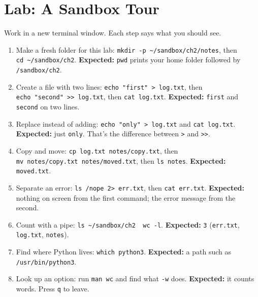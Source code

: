 \section{Lab: A Sandbox Tour}\label{02-the-shell-talking-to-your-computer-in-words:lab-a-sandbox-tour}

Work in a new terminal window. Each step says what you should see.

\begin{enumerate}
\def\labelenumi{\arabic{enumi}.}
\tightlist
\item
  Make a fresh folder for this lab: \texttt{mkdir\ -}\allowbreak{}\texttt{p\ \textasciitilde{}/}\allowbreak{}\texttt{sandbox/}\allowbreak{}\texttt{ch2/}\allowbreak{}\texttt{notes}, then \texttt{cd\ \textasciitilde{}/sandbox/ch2}. \textbf{Expected:} \texttt{pwd} prints your home folder followed by \texttt{/sandbox/ch2}.
\item
  Create a file with two lines: \texttt{echo\ "first"\ \textgreater{}\ log.txt}, then \texttt{echo\ "second"\ \textgreater{}\textgreater{}\ log.}\allowbreak{}\texttt{txt}, then \texttt{cat\ log.txt}. \textbf{Expected:} \texttt{first} and \texttt{second} on two lines.
\item
  Replace instead of adding: \texttt{echo\ "only"\ \textgreater{}\ log.txt} and \texttt{cat\ log.txt}. \textbf{Expected:} just \texttt{only}. That's the difference between \texttt{\textgreater{}} and \texttt{\textgreater{}\textgreater{}}.
\item
  Copy and move: \texttt{cp\ log.}\allowbreak{}\texttt{txt\ notes/}\allowbreak{}\texttt{copy.}\allowbreak{}\texttt{txt}, then \texttt{mv\ notes/}\allowbreak{}\texttt{copy.}\allowbreak{}\texttt{txt\ notes/}\allowbreak{}\texttt{moved.}\allowbreak{}\texttt{txt}, then \texttt{ls\ notes}. \textbf{Expected:} \texttt{moved.txt}.
\item
  Separate an error: \texttt{ls\ /}\allowbreak{}\texttt{nope\ 2\textgreater{}\ err.txt}, then \texttt{cat\ err.txt}. \textbf{Expected:} nothing on screen from the first command; the error message from the second.
\item
  Count with a pipe: \texttt{ls\ \textasciitilde{}/}\allowbreak{}\texttt{sandbox/}\allowbreak{}\texttt{ch2\ \textbar{}\ wc\ -}\allowbreak{}\texttt{l}. \textbf{Expected:} \texttt{3} (\texttt{err.txt}, \texttt{log.txt}, \texttt{notes}).
\item
  Find where Python lives: \texttt{which\ python3}. \textbf{Expected:} a path such as \texttt{/usr/bin/python3}.
\item
  Look up an option: run \texttt{man\ wc} and find what \texttt{-w} does. \textbf{Expected:} it counts words. Press \texttt{q} to leave.
\end{enumerate}

